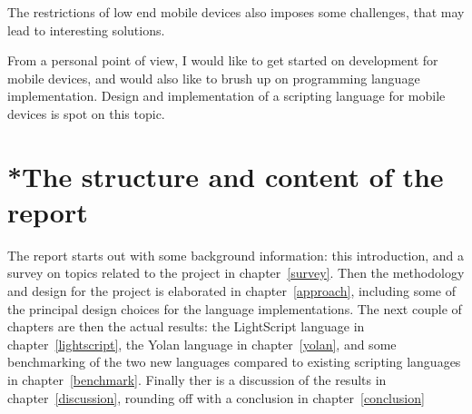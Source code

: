 The restrictions of low end mobile devices also imposes some challenges, that may lead to interesting solutions.


From a personal point of view, 
I would like to get started on development for mobile devices, 
and would also like to brush up on programming language implementation.
Design and implementation of a scripting language for mobile devices is spot on this topic.


\section{*The structure and content of the report}

The report starts out with some background information: this introduction, and a survey on topics related to the project in chapter~\ref{survey}.
Then the methodology and design for the project is elaborated in chapter~\ref{approach}, including some of the principal design choices for the language implementations.
The next couple of chapters are then the actual results: the LightScript language in chapter~\ref{lightscript}, the Yolan language in chapter~\ref{yolan}, and some benchmarking of the two new languages compared to existing scripting languages in chapter~\ref{benchmark}.
Finally ther is a discussion of the results in chapter~\ref{discussion}, rounding off with a conclusion in chapter~\ref{conclusion}
